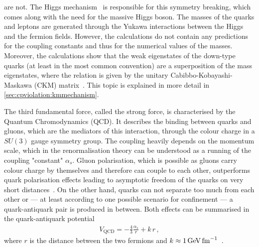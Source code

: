 are not. The Higgs mechanism~\cite{Higgs:1964pj} is responsible for this
symmetry breaking, which comes along with the need for the massive Higgs boson.
The masses of the quarks and leptons are generated through the Yukawa
interactions between the Higgs and the fermion fields. However, the
calculations do not contain any predictions for the coupling constants and
thus for the numerical values of the masses. Moreover, the calculations show that the weak
eigenstates of the down-type quarks (at least in the most common convention)
are a superposition of the mass eigenstates, where the relation is given by
the unitary Cabibbo-Kobayashi-Maskawa (CKM) matrix~\cite{Kobayashi:1973fv}.
This topic is explained in more detail in \cref{sec:cpviolation:kmmechanism}.


The third fundamental force, called the strong force, is characterised by the
Quantum Chromodynamics (QCD). It describes the binding between quarks and
gluons, which are the mediators of this interaction, through the colour charge
in a $SU(3)$ gauge symmetry group. The coupling heavily depends on the
momentum scale, which in the renormalisation theory can be understood as a
running of the coupling "constant" $\alpha_s$. Gluon polarisation, which is
possible as gluons carry colour charge by themselves and therefore can couple
to each other, outperforms quark polarisation effects leading to asymptotic
freedom of the quarks on very short
distances~\cite{AsymptoticFreedom_GrossWilczek,AsymptoticFreedom_Politzer}. On
the other hand, quarks can not separate too much from each other or --- at
least according to one possible scenario for confinement --- a quark-antiquark
pair is produced in between. Both effects can be summarised in the
quark-antiquark potential
\begin{align}
	V_{\mathrm{QCD}} = - \frac 43 \frac{\alpha_s}{r} + k\,r\,,
\end{align}
where $r$ is the distance between the two fermions and $k \approx
\SI{1}{\GeV\fm^{-1}}$~\cite{Perkins:1982xb}.